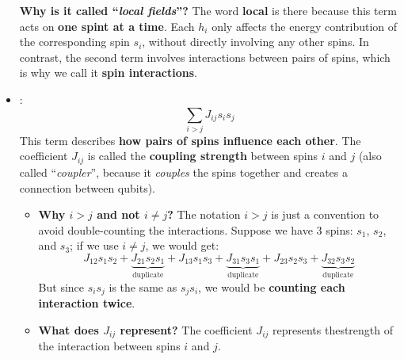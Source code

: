 \begin{itemize}
    \textcolor{Green3}{ \textbf{Why is it called ``\emph{local fields}''?}} The word \textbf{local} is there because this term acts on \textbf{one spint at a time}. Each $h_i$ only affects the energy contribution of the corresponding spin $s_i$, without directly involving any other spins. In contrast, the second term involves interactions between pairs of spins, which is why we call it \textbf{spin interactions}.


    \item {}:
    \begin{equation*}
        \sum_{i>j} J_{ij} s_i s_j
    \end{equation*}
    This term describes \textbf{how pairs of spins influence each other}. The coefficient $J_{ij}$ is called the \textbf{coupling strength} between spins $i$ and $j$ (also called ``\emph{coupler}'', because it \emph{couples} the spins together and creates a connection between qubits).
    \begin{itemize}
        \item[\textcolor{Green3}{\faIcon{question-circle}}] \textcolor{Green3}{\textbf{Why $i>j$ and not $i \neq j$?}} The notation $i>j$ is just a convention to avoid double-counting the interactions. Suppose we have 3 spins: $s_1$, $s_2$, and $s_3$; if we use $i \neq j$, we would get:
        \begin{equation*}
            J_{12} s_1 s_2 + \underbrace{J_{21} s_2 s_1}_{\text{duplicate}} + J_{13} s_1 s_3 + \underbrace{J_{31} s_3 s_1}_{\text{duplicate}} + J_{23} s_2 s_3 + \underbrace{J_{32} s_3 s_2}_{\text{duplicate}}
        \end{equation*}
        But since $s_i s_j$ is the same as $s_j s_i$, we would be \textbf{counting each interaction twice}.

        \item[\textcolor{Green3}{\faIcon{question-circle}}] \textcolor{Green3}{\textbf{What does $J_{ij}$ represent?}} The coefficient $J_{ij}$ represents the\break strength of the interaction between spins $i$ and $j$.


\end{itemize}
\end{itemize}
